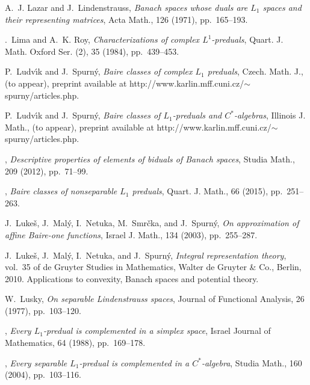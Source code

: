 \documentclass{amsart}
\numberwithin{equation}{section}
\theoremstyle{definition}
\begin{document}
\begin{thebibliography}{10}
{\sc A.~J. Lazar and J.~Lindenstrauss}, {\em Banach spaces whose duals are
  {$L_{1}$} spaces and their representing matrices}, Acta Math., 126 (1971),
  pp.~165--193.

{\sc {\AA}.~Lima and A.~K. Roy}, {\em Characterizations of complex
  {$L^1$}-preduals}, Quart. J. Math. Oxford Ser. (2), 35 (1984), pp.~439--453.

{\sc P.~Ludv\'{\i}k and J.~Spurn\'y}, {\em Baire classes of complex {$L_1$}
  preduals}, Czech. Math. J., \rm(to appear), preprint available at
  http://www.karlin.mff.cuni.cz/$\sim$spurny/articles.php.

{\sc P.~Ludv{\'{\i}}k and J.~Spurn{\'y}}, {\em Baire classes of
  {$L_1$}-preduals and {$C^*$}-algebras}, Illinois J. Math., \rm (to appear),
  preprint available at
  http://www.karlin.mff.cuni.cz/$\sim$spurny/articles.php.

\leavevmode\vrule height 2pt depth -1.6pt width 23pt, {\em Descriptive
  properties of elements of biduals of {B}anach spaces}, Studia Math., 209
  (2012), pp.~71--99.

\leavevmode\vrule height 2pt depth -1.6pt width 23pt, {\em Baire classes of
  nonseparable {$L_1$} preduals}, Quart. J. Math., 66 (2015), pp.~251--263.

{\sc J.~Luke{\v{s}}, J.~Mal{\'y}, I.~Netuka, M.~Smr{\v{c}}ka, and
  J.~Spurn{\'y}}, {\em On approximation of affine {B}aire-one functions},
  Israel J. Math., 134 (2003), pp.~255--287.

{\sc J.~Luke{\v{s}}, J.~Mal{\'y}, I.~Netuka, and J.~Spurn{\'y}}, {\em Integral
  representation theory}, vol.~35 of de Gruyter Studies in Mathematics, Walter
  de Gruyter \& Co., Berlin, 2010.
\newblock Applications to convexity, Banach spaces and potential theory.

{\sc W.~Lusky}, {\em On separable {L}indenstrauss spaces}, Journal of
  Functional Analysis, 26 (1977), pp.~103--120.

\leavevmode\vrule height 2pt depth -1.6pt width 23pt, {\em Every
  {$L_1$}-predual is complemented in a simplex space}, Israel Journal of
  Mathematics, 64 (1988), pp.~169--178.

\leavevmode\vrule height 2pt depth -1.6pt width 23pt, {\em Every separable
  {$L_1$}-predual is complemented in a {$C^*$}-algebra}, Studia Math., 160
  (2004), pp.~103--116.


\end{thebibliography}
\end{document}
